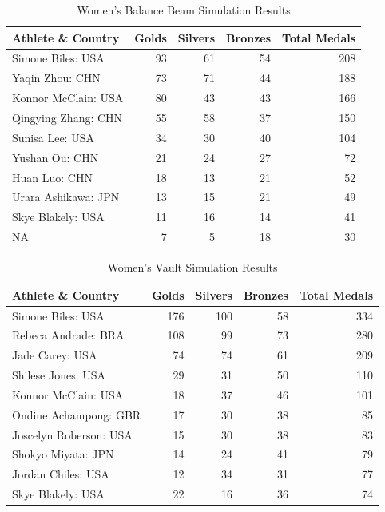 \documentclass[
  letterpaper,
  DIV=11,
  numbers=noendperiod]{scrartcl}
\begin{document}
\begin{table}[H]

\caption{Women's Balance Beam Simulation Results }
\centering
\fontsize{8}{10}\selectfont
\begin{tabular}[t]{l|r|r|r|r}
\hline
Athlete \& Country & Golds & Silvers & Bronzes & Total Medals\\
\hline
Simone Biles: USA & 93 & 61 & 54 & 208\\
\hline
Yaqin Zhou: CHN & 73 & 71 & 44 & 188\\
\hline
Konnor McClain: USA & 80 & 43 & 43 & 166\\
\hline
Qingying Zhang: CHN & 55 & 58 & 37 & 150\\
\hline
Sunisa Lee: USA & 34 & 30 & 40 & 104\\
\hline
Yushan Ou: CHN & 21 & 24 & 27 & 72\\
\hline
Huan Luo: CHN & 18 & 13 & 21 & 52\\
\hline
Urara Ashikawa: JPN & 13 & 15 & 21 & 49\\
\hline
Skye Blakely: USA & 11 & 16 & 14 & 41\\
\hline
NA & 7 & 5 & 18 & 30\\
\hline
\end{tabular}
\end{table}

\begin{table}[H]

\caption{Women's Vault Simulation Results }
\centering
\fontsize{8}{10}\selectfont
\begin{tabular}[t]{l|r|r|r|r}
\hline
Athlete \& Country & Golds & Silvers & Bronzes & Total Medals\\
\hline
Simone Biles: USA & 176 & 100 & 58 & 334\\
\hline
Rebeca Andrade: BRA & 108 & 99 & 73 & 280\\
\hline
Jade Carey: USA & 74 & 74 & 61 & 209\\
\hline
Shilese Jones: USA & 29 & 31 & 50 & 110\\
\hline
Konnor McClain: USA & 18 & 37 & 46 & 101\\
\hline
Ondine Achampong: GBR & 17 & 30 & 38 & 85\\
\hline
Joscelyn Roberson: USA & 15 & 30 & 38 & 83\\
\hline
Shokyo Miyata: JPN & 14 & 24 & 41 & 79\\
\hline
Jordan Chiles: USA & 12 & 34 & 31 & 77\\
\hline
Skye Blakely: USA & 22 & 16 & 36 & 74\\
\hline
\end{tabular}
\end{table}
\end{document}
